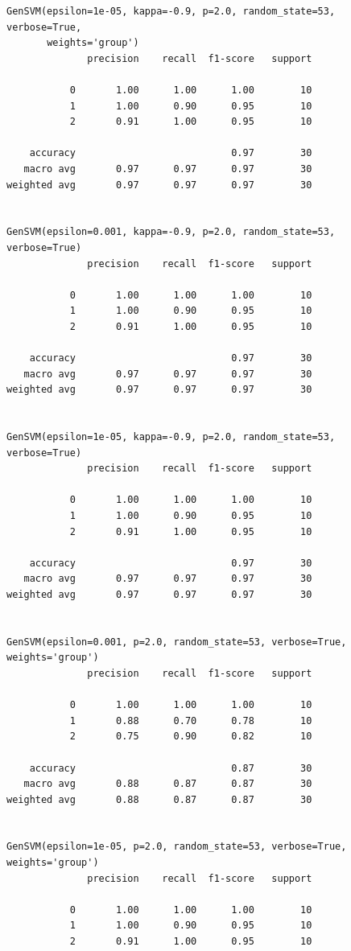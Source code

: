 \documentclass{article}
\begin{document}
\begin{LTR}
\begin{verbatim}
GenSVM(epsilon=1e-05, kappa=-0.9, p=2.0, random_state=53, verbose=True,
       weights='group')
              precision    recall  f1-score   support

           0       1.00      1.00      1.00        10
           1       1.00      0.90      0.95        10
           2       0.91      1.00      0.95        10

    accuracy                           0.97        30
   macro avg       0.97      0.97      0.97        30
weighted avg       0.97      0.97      0.97        30


GenSVM(epsilon=0.001, kappa=-0.9, p=2.0, random_state=53, verbose=True)
              precision    recall  f1-score   support

           0       1.00      1.00      1.00        10
           1       1.00      0.90      0.95        10
           2       0.91      1.00      0.95        10

    accuracy                           0.97        30
   macro avg       0.97      0.97      0.97        30
weighted avg       0.97      0.97      0.97        30


GenSVM(epsilon=1e-05, kappa=-0.9, p=2.0, random_state=53, verbose=True)
              precision    recall  f1-score   support

           0       1.00      1.00      1.00        10
           1       1.00      0.90      0.95        10
           2       0.91      1.00      0.95        10

    accuracy                           0.97        30
   macro avg       0.97      0.97      0.97        30
weighted avg       0.97      0.97      0.97        30


GenSVM(epsilon=0.001, p=2.0, random_state=53, verbose=True, weights='group')
              precision    recall  f1-score   support

           0       1.00      1.00      1.00        10
           1       0.88      0.70      0.78        10
           2       0.75      0.90      0.82        10

    accuracy                           0.87        30
   macro avg       0.88      0.87      0.87        30
weighted avg       0.88      0.87      0.87        30


GenSVM(epsilon=1e-05, p=2.0, random_state=53, verbose=True, weights='group')
              precision    recall  f1-score   support

           0       1.00      1.00      1.00        10
           1       1.00      0.90      0.95        10
           2       0.91      1.00      0.95        10


\end{verbatim}
\end{LTR}
\end{document}
